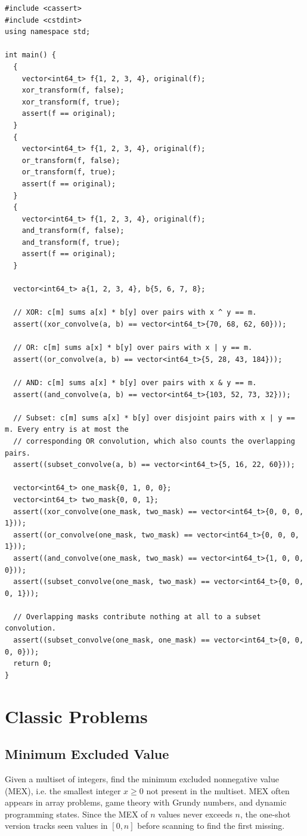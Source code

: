 \begin{lstlisting}[style=cpp]
#include <cassert>
#include <cstdint>
using namespace std;

int main() {
  {
    vector<int64_t> f{1, 2, 3, 4}, original(f);
    xor_transform(f, false);
    xor_transform(f, true);
    assert(f == original);
  }
  {
    vector<int64_t> f{1, 2, 3, 4}, original(f);
    or_transform(f, false);
    or_transform(f, true);
    assert(f == original);
  }
  {
    vector<int64_t> f{1, 2, 3, 4}, original(f);
    and_transform(f, false);
    and_transform(f, true);
    assert(f == original);
  }

  vector<int64_t> a{1, 2, 3, 4}, b{5, 6, 7, 8};

  // XOR: c[m] sums a[x] * b[y] over pairs with x ^ y == m.
  assert((xor_convolve(a, b) == vector<int64_t>{70, 68, 62, 60}));

  // OR: c[m] sums a[x] * b[y] over pairs with x | y == m.
  assert((or_convolve(a, b) == vector<int64_t>{5, 28, 43, 184}));

  // AND: c[m] sums a[x] * b[y] over pairs with x & y == m.
  assert((and_convolve(a, b) == vector<int64_t>{103, 52, 73, 32}));

  // Subset: c[m] sums a[x] * b[y] over disjoint pairs with x | y == m. Every entry is at most the
  // corresponding OR convolution, which also counts the overlapping pairs.
  assert((subset_convolve(a, b) == vector<int64_t>{5, 16, 22, 60}));

  vector<int64_t> one_mask{0, 1, 0, 0};
  vector<int64_t> two_mask{0, 0, 1};
  assert((xor_convolve(one_mask, two_mask) == vector<int64_t>{0, 0, 0, 1}));
  assert((or_convolve(one_mask, two_mask) == vector<int64_t>{0, 0, 0, 1}));
  assert((and_convolve(one_mask, two_mask) == vector<int64_t>{1, 0, 0, 0}));
  assert((subset_convolve(one_mask, two_mask) == vector<int64_t>{0, 0, 0, 1}));

  // Overlapping masks contribute nothing at all to a subset convolution.
  assert((subset_convolve(one_mask, one_mask) == vector<int64_t>{0, 0, 0, 0}));
  return 0;
}
\end{lstlisting}

\section{\texorpdfstring{Classic Problems}{1.8 Classic Problems}}
\setcounter{section}{8}
\setcounter{subsection}{0}
\subsection{Minimum Excluded Value}
\label{sec:1.8.1}
Given a multiset of integers, find the minimum excluded nonnegative value (MEX), i.e. the smallest integer $x \geq 0$ not present in the multiset. MEX often appears in array problems, game theory with Grundy numbers, and dynamic programming states. Since the MEX of $n$ values never exceeds $n$, the one-shot version tracks seen values in $[0, n]$ before scanning to find the first missing.

